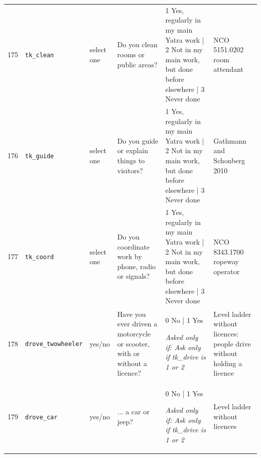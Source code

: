 \documentclass[9pt,a4paper,landscape]{article}
\begin{document}
\begin{longtable}{@{}p{0.5cm}p{3.3cm}p{1.7cm}p{7.3cm}p{5.6cm}p{5.4cm}@{}}
\footnotesize 175 & \footnotesize\texttt{tk\_clean} & \scriptsize select one & \footnotesize Do you clean rooms or public areas? \par\vspace{1pt}{\footnotesize\color{hdr}{\hifont क्या आप कमरे या सार्वजनिक जगह साफ़ करना का काम करते हैं? (1 अपने मुख्य यात्रा-काम में नियमित; 2 मुख्य काम में नहीं, पर पहले कहीं और किया है; 3 कभी नहीं)}} & \scriptsize 1 Yes, regularly in my main Yatra work | 2 Not in my main work, but done before elsewhere | 3 Never done & \scriptsize NCO 5151.0202 room attendant\\
\footnotesize 176 & \footnotesize\texttt{tk\_guide} & \scriptsize select one & \footnotesize Do you guide or explain things to visitors? \par\vspace{1pt}{\footnotesize\color{hdr}{\hifont क्या आप आने वालों को रास्ता या बात समझाना का काम करते हैं? (1 अपने मुख्य यात्रा-काम में नियमित; 2 मुख्य काम में नहीं, पर पहले कहीं और किया है; 3 कभी नहीं)}} & \scriptsize 1 Yes, regularly in my main Yatra work | 2 Not in my main work, but done before elsewhere | 3 Never done & \scriptsize Gathmann and Schonberg 2010\\
\footnotesize 177 & \footnotesize\texttt{tk\_coord} & \scriptsize select one & \footnotesize Do you coordinate work by phone, radio or signals? \par\vspace{1pt}{\footnotesize\color{hdr}{\hifont क्या आप फ़ोन, रेडियो या इशारों से दूसरों के साथ तालमेल करना का काम करते हैं? (1 अपने मुख्य यात्रा-काम में नियमित; 2 मुख्य काम में नहीं, पर पहले कहीं और किया है; 3 कभी नहीं)}} & \scriptsize 1 Yes, regularly in my main Yatra work | 2 Not in my main work, but done before elsewhere | 3 Never done & \scriptsize NCO 8343.1700 ropeway operator\\
\footnotesize 178 & \footnotesize\texttt{drove\_twowheeler} & \scriptsize yes/no & \footnotesize Have you ever driven a motorcycle or scooter, with or without a licence?\par\vspace{1pt}{\footnotesize\color{hdr}{\hifont क्या आपने कभी मोटरसाइकिल या स्कूटर चलाई है, लाइसेंस हो या न हो?}} & \scriptsize 0 No | 1 Yes\par\vspace{1pt}\textit{Asked only if: Ask only if tk\_drive is 1 or 2} & \scriptsize Level ladder without licences: people drive without holding a licence\\
\footnotesize 179 & \footnotesize\texttt{drove\_car} & \scriptsize yes/no & \footnotesize ... a car or jeep?\par\vspace{1pt}{\footnotesize\color{hdr}{\hifont ...कार या जीप?}} & \scriptsize 0 No | 1 Yes\par\vspace{1pt}\textit{Asked only if: Ask only if tk\_drive is 1 or 2} & \scriptsize Level ladder without licences\\

\end{longtable}
\end{document}
